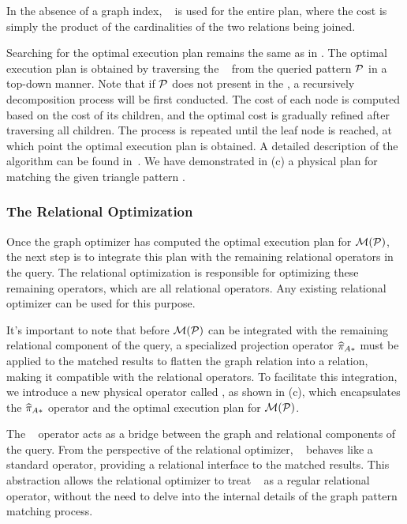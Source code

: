 In the absence of a graph index, \hashjoin~ is used for the entire plan, where the cost is simply the product of the cardinalities of the two relations being joined.

 Searching for the optimal execution plan remains the same as in \glogs. The optimal execution plan is obtained by traversing the \glogue~ from the queried pattern $\mathcal{P}$ in a top-down manner.
Note that if $\mathcal{P}$ does not present in the \glogue, a recursively decomposition process will be first conducted. The cost of each node is computed based on the cost of its children, and the optimal cost is gradually refined after traversing all children. The process is repeated until the leaf node is reached, at which point the optimal execution plan is obtained. A detailed description of the algorithm can be found in~\cite{GLogS}.
We have demonstrated in (c) a physical plan for matching the given triangle pattern
.


\subsubsection{The Relational Optimization}
Once the graph optimizer has computed the optimal execution plan for $\mathcal{M}(\mathcal{P})$, the next step is to integrate this plan with the remaining relational operators in the \spjm query. The relational optimization is responsible for optimizing these remaining operators, which are all relational operators. Any existing relational optimizer can be used for this purpose.

It's important to note that before $\mathcal{M}(\mathcal{P})$ can be integrated with the remaining relational component of the query, a specialized projection operator $\widehat{\pi}_{A*}$ must be applied to the matched results to flatten the graph relation into a relation, making it compatible with the relational operators. To facilitate this integration, we introduce a new physical operator called \scangraphtable, as shown in (c), which encapsulates the $\widehat{\pi}_{A*}$ operator and the optimal execution plan for $\mathcal{M}(\mathcal{P})$.

The \scangraphtable~ operator acts as a bridge between the graph and relational components of the query. From the perspective of the relational optimizer, \scangraphtable~ behaves like a standard \scan operator, providing a relational interface to the matched results. This abstraction allows the relational optimizer to treat \scangraphtable~ as a regular relational operator, without the need to delve into the internal details of the graph pattern matching process.

